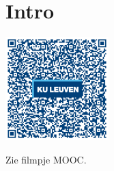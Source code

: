 
\section*{Intro}
\begin{minipage}{.25\linewidth}
	\raggedright
	\includegraphics[width=4cm]{6_afgeleiden_integralen/inputs/QR_Code_INTRO_module6new}
\end{minipage}
\begin{minipage}{.7\linewidth}
	Zie filmpje MOOC.
\end{minipage}



